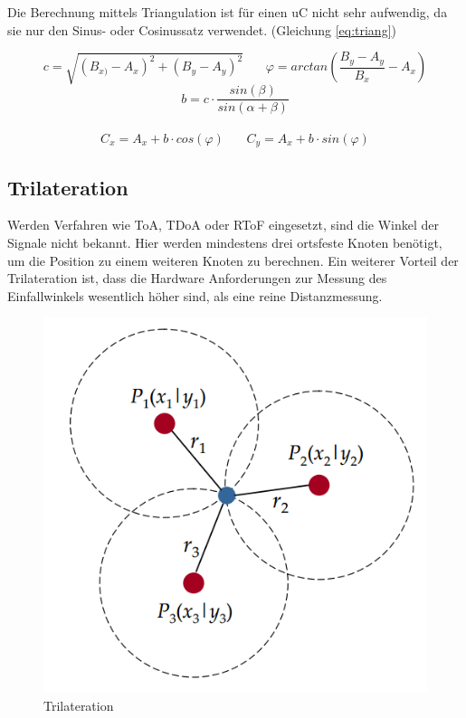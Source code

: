 Die Berechnung mittels Triangulation ist für einen \ac{uC} nicht sehr
aufwendig, da sie nur den Sinus- oder Cosinussatz verwendet. (Gleichung
\ref{eq:triang})

\pagebreak
\begin{framed}
\begin{equation}
  \label{eq:triang}
  c = \sqrt{(B_{x)} - A_{x})^2 + (B_{y} - A_{y})^2}
  ~~~~~~~~
  \varphi = arctan(\frac{B_{y} - A_{y}}{B_{x}} - A_{x})
\end{equation}
\begin{equation*}
  b = c \cdot \frac{sin(\beta)}{sin(\alpha + \beta)}
\end{equation*}
~\\
\begin{equation*}
  C_{x} = A_{x} + b \cdot cos(\varphi)
  ~~~~~~~~
  C_{y} = A_{x} + b \cdot sin(\varphi)
\end{equation*}
\end{framed}


\subsection{Trilateration}

Werden Verfahren wie \ac{ToA}, \ac{TDoA} oder \ac{RToF} eingesetzt,
sind die Winkel der Signale nicht bekannt. Hier werden mindestens
drei ortsfeste Knoten benötigt, um die Position zu einem weiteren
Knoten zu berechnen. Ein weiterer Vorteil der Trilateration ist, dass
die Hardware Anforderungen zur Messung des Einfallwinkels wesentlich
höher sind, als eine reine Distanzmessung. \cite{roehrig2009} 

\begin{figure}[h!]
  \centering
  \includegraphics[scale=0.5]{img/trilat}

  \caption{Trilateration}
  \label{fig:trilat}
\end{figure}

